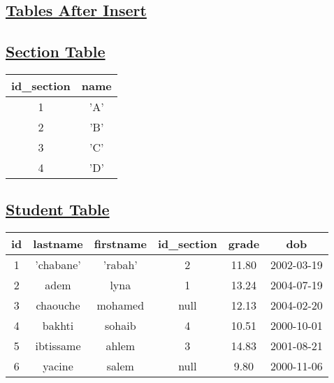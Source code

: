 \subsection*{\underline{\textbf{Tables After Insert}}}

\subsection*{\underline{\textbf{Section Table}}}

\begin{center}

 \renewcommand{\arraystretch}{1.5}
    \begin{tabular}{|c|c|}
        \hline 
        id\_section & name \\
        \hline
        1 & 'A'\\
        \hline
        2 & 'B'\\
        \hline
        3 & 'C'\\
        \hline
        4 & 'D'\\
        \hline
    \end{tabular}
\end{center}

\subsection*{\underline{\textbf{Student Table}}}
\begin{center}

 \renewcommand{\arraystretch}{1.5}
    \begin{tabular}{|c|c|c|c|c|c|}
        \hline
        id & lastname & firstname & id\_section & grade & dob\\
        \hline
        1 & 'chabane' & 'rabah' & 2 & 11.80 & 2002-03-19 \\
        \hline
        2 & adem & lyna & 1 & 13.24 & 2004-07-19\\
        \hline
        3 & chaouche & mohamed & null & 12.13 & 2004-02-20 \\
        \hline    
        4 & bakhti & sohaib & 4 & 10.51 & 2000-10-01 \\
        \hline    
        5 & ibtissame & ahlem & 3 & 14.83 & 2001-08-21 \\
        \hline 
        6 & yacine & salem & null & 9.80 & 2000-11-06 \\
        \hline
    \end{tabular}
\end{center}


